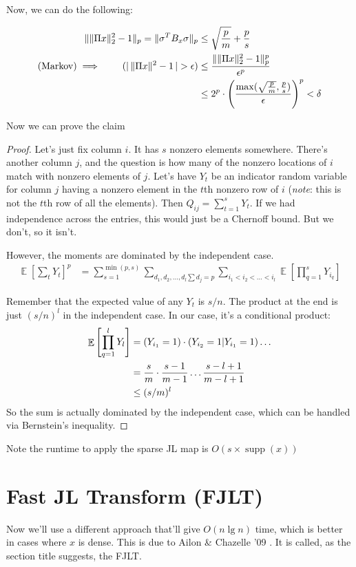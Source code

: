 \documentclass[11pt]{article}
\DeclareMathOperator*{\E}{\mathbb{E}}
\let\Pr\relax
\DeclareMathOperator*{\Pr}{\mathbb{P}}
\newcommand{\on}{\operatorname}
\begin{document}
Now, we can do the following:

\begin{align*}
\|\|\Pi x\|_2^2 - 1\|_p = \|\sigma^TB_x\sigma\|_p &\leq \sqrt{\frac{p}{m}} + \frac{p}{s} \\
(\on{Markov}) \implies \qquad \Pr(|\,\|\Pi x\|^2 - 1\,| > \epsilon) &\leq \frac{\| \|\Pi x\|_2^2 - 1\|_p^p}{\epsilon^p}\\
&\leq 2^p \cdot \left(\frac{\on{max}(\sqrt{\frac{p}{m}},\frac{p}{s})}{\epsilon}\right)^p < \delta
\end{align*}

Now we can prove the claim

\begin{proof}
  Let's just fix column $i$. It has $s$ nonzero elements somewhere. There's another column $j$, and the question is how many of the nonzero locations of $i$ match with nonzero elements of $j$. Let's have $Y_t$ be an indicator random variable for column $j$ having a nonzero element in the $t$th nonzero row of $i$ (\emph{note}: this is not the $t$th row of all the elements). Then $Q_{ij} = \sum_{t = 1}^{s} Y_t$. If we had independence across the entries, this would just be a Chernoff bound. But we don't, so it isn't.

  \smallskip

  However, the moments are dominated by the independent case.
  \begin{align*}
    \E[\sum_t Y_t]^p &= \sum_{s = 1}^{\on{min}(p, s)}\sum_{d_1, d_2, \ldots, d_l \sum d_j = p}\sum_{i_1 < i_2 < \ldots < i_l} \E[\prod_{q = 1}^s Y_{i_q}]
  \end{align*}

  Remember that the expected value of any $Y_t$ is $s/n$. The product at the end is just $(s/n)^l$ in the independent case. In our case, it's a conditional product:
  \begin{align*}
    \E\left[\prod_{q = 1}^l Y_l\right] &= \Pr(Y_{i_1} = 1) \cdot \Pr(Y_{i_2} = 1|Y_{i_ 1} = 1) \ldots\\\
    &= \frac{s}{m}\cdot\frac{s-1}{m-1}\ldots\frac{s - l + 1}{m - l + 1} \\
    &\leq (s/m)^l
  \end{align*}
  So the sum is actually dominated by the independent case, which can be handled via Bernstein's inequality.
\end{proof}

Note the runtime to apply the sparse JL map is $O(s \times \on{supp}(x))$

\section{Fast JL Transform (FJLT)}
Now we'll use a different approach that'll give $O(n\lg n)$ time, which is better in cases where $x$ is dense. This is due to Ailon \& Chazelle '09 \cite{ailon2009fast}. It is called, as the section title suggests, the FJLT.
\end{document}
